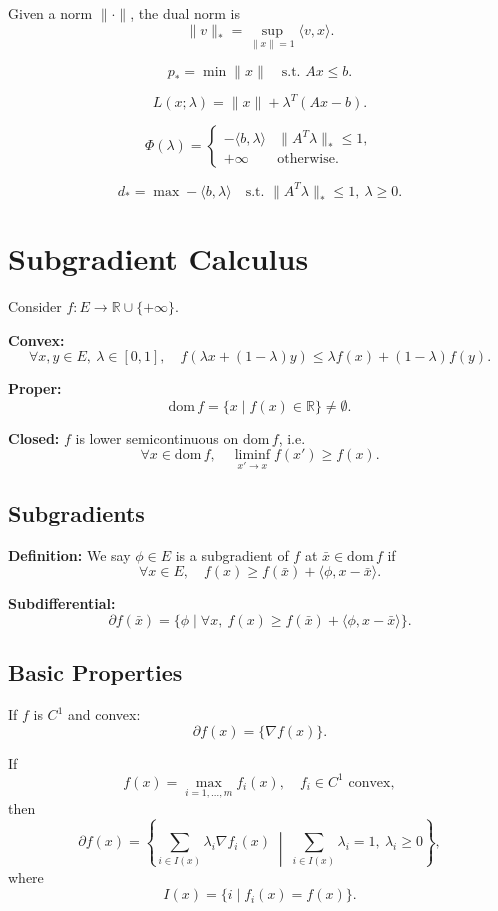 \documentclass[12pt,oneside]{book}
\numberwithin{equation}{section}
\theoremstyle{definition}
\theoremstyle{plain}
\theoremstyle{remark}
\begin{document}
Given a norm $\|\cdot\|$, the dual norm is
\[
\|v\|_* = \sup_{\|x\|=1} \langle v,x \rangle.
\]

\[
p_* =
\min \|x\|
\quad \text{s.t. } Ax \le b.
\]

\[
L(x;\lambda) = \|x\| + \lambda^T(Ax - b).
\]

\[
\Phi(\lambda) =
\begin{cases}
-\langle b,\lambda \rangle & \|A^T \lambda\|_* \le 1,\\
+\infty & \text{otherwise}.
\end{cases}
\]

\[
d_* =
\max -\langle b,\lambda \rangle
\quad \text{s.t. } \|A^T \lambda\|_* \le 1,\ \lambda \ge 0.
\]

\section{Subgradient Calculus}

Consider $f : E \to \mathbb{R} \cup \{+\infty\}$.

\textbf{Convex:}
\[
\forall x,y \in E,\ \lambda \in [0,1], \quad
f(\lambda x + (1-\lambda)y) \le \lambda f(x) + (1-\lambda) f(y).
\]

\textbf{Proper:}
\[
\mathrm{dom}\, f = \{x \mid f(x) \in \mathbb{R}\} \neq \emptyset.
\]

\textbf{Closed:}
$f$ is lower semicontinuous on $\mathrm{dom}\, f$, i.e.
\[
\forall x \in \mathrm{dom}\, f, \quad
\liminf_{x' \to x} f(x') \ge f(x).
\]

\subsection{Subgradients}

\textbf{Definition:}
We say $\phi \in E$ is a subgradient of $f$ at $\bar{x} \in \mathrm{dom}\, f$ if
\[
\forall x \in E, \quad
f(x) \ge f(\bar{x}) + \langle \phi, x - \bar{x} \rangle.
\]

\textbf{Subdifferential:}
\[
\partial f(\bar{x}) = \{\phi \mid \forall x,\ f(x) \ge f(\bar{x}) + \langle \phi, x - \bar{x} \rangle\}.
\]

\subsection{Basic Properties}

If $f$ is $C^1$ and convex:
\[
\partial f(x) = \{\nabla f(x)\}.
\]

If
\[
f(x) = \max_{i=1,\dots,m} f_i(x), \quad f_i \in C^1 \text{ convex},
\]
then
\[
\partial f(x)
=
\left\{
\sum_{i \in I(x)} \lambda_i \nabla f_i(x)
\;\middle|\;
\sum_{i \in I(x)} \lambda_i = 1,\ \lambda_i \ge 0
\right\},
\]
where
\[
I(x) = \{i \mid f_i(x) = f(x)\}.
\]
\end{document}
